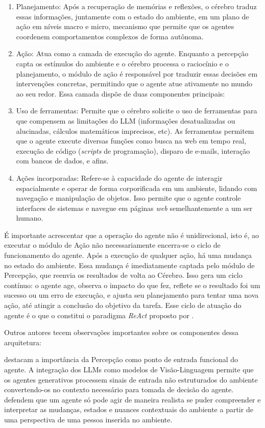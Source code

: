 \documentclass[12pt,oneside,a4paper,brazil,sumario=tradicional]{abntex2}
\begin{document}
\begin{enumerate}
  \item Planejamento: Após a recuperação de memórias e reflexões, o cérebro traduz essas informações, juntamente com o estado do ambiente, em um plano de ação em níveis macro e micro, mecanismo que permite que os agentes coordenem comportamentos complexos de forma autônoma.
  \item Ação: Atua como a camada de execução do agente. Enquanto a percepção capta os estímulos do ambiente e o cérebro processa o raciocínio e o planejamento, o módulo de ação é responsável por traduzir essas decisões em intervenções concretas, permitindo que o agente atue ativamente no mundo ao seu redor. Essa camada dispõe de duas componentes principais:
  \item Uso de ferramentas: Permite que o cérebro solicite o uso de ferramentas para que compensem as limitações do LLM (informações desatualizadas ou alucinadas, cálculos matemáticos imprecisos, etc). As ferramentas permitem que o agente execute diversas funções como busca na web em tempo real, execução de código (\textit{scripts }de programação), disparo de e-mails, interação com bancos de dados, e afins.
  \item Ações incorporadas: Refere-se à capacidade do agente de interagir espacialmente e operar de forma corporificada em um ambiente, lidando com navegação e manipulação de objetos. Isso permite que o agente controle interfaces de sistemas e navegue em páginas \textit{web }semelhantemente a um ser humano.
\end{enumerate}
É importante acrescentar que a operação do agente não é unidirecional, isto é, ao executar o módulo de Ação não necessariamente encerra-se o ciclo de funcionamento do agente.  Após a execução de qualquer ação, há uma mudança no estado do ambiente. Essa mudança é imediatamente captada pelo módulo de Percepção, que reenvia os resultados de volta ao Cérebro. Isso gera um ciclo contínuo: o agente age, observa o impacto do que fez, reflete se o resultado foi um sucesso ou um erro de execução, e ajusta seu planejamento para tentar uma nova ação, até atingir a conclusão do objetivo da tarefa. Esse ciclo de atuação do agente é o que o constitui o paradigma \textit{ReAct }proposto por .

Outros autores tecem observações importantes sobre os componentes dessa arquitetura:

 destacam a importância da Percepção como ponto de entrada funcional do agente. A integração dos LLMs como modelos de Visão-Linguagem permite que os agentes generativos processem sinais de entrada não estruturados do ambiente convertendo-os no contexto necessário para tomada de decisão do agente.  defendem que um agente só pode agir de maneira realista se puder compreender e interpretar as mudanças, estados e nuances contextuais do ambiente a partir de uma perspectiva de uma pessoa inserida no ambiente.
\end{document}
